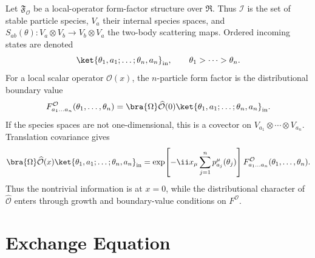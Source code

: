 Let \(\mathfrak F_{\mathcal O}\) be a local-operator form-factor structure over
\(\mathfrak R\).  Thus \(\mathcal I\) is the set of stable particle species,
\(V_a\) their internal species spaces, and
\(S_{ab}(\theta):V_a\otimes V_b\to V_b\otimes V_a\) the two-body scattering
maps.  Ordered incoming states are denoted
\[
  \ket{\theta_1,a_1;\ldots;\theta_n,a_n}_{\rm in},
  \qquad
  \theta_1>\cdots>\theta_n .
\]
For a local scalar operator \(\widehat{\mathcal O}(x)\), the \(n\)-particle
form factor is the distributional boundary value
\[
  F^{\mathcal O}_{a_1\ldots a_n}(\theta_1,\ldots,\theta_n)
  =
  \bra{\Omega}\widehat{\mathcal O}(0)
  \ket{\theta_1,a_1;\ldots;\theta_n,a_n}_{\rm in}.
\]
If the species spaces are not one-dimensional, this is a covector on
\(V_{a_1}\otimes\cdots\otimes V_{a_n}\).  Translation covariance gives
\[
  \bra{\Omega}\widehat{\mathcal O}(x)
  \ket{\theta_1,a_1;\ldots;\theta_n,a_n}_{\rm in}
  =
  \exp\!\left[-\ii x_\mu\sum_{j=1}^n p_{a_j}^\mu(\theta_j)\right]
  F^{\mathcal O}_{a_1\ldots a_n}(\theta_1,\ldots,\theta_n).
\]
Thus the nontrivial information is at \(x=0\), while the distributional
character of \(\widehat{\mathcal O}\) enters through growth and boundary-value
conditions on \(F^{\mathcal O}\).

\section{Exchange Equation}

